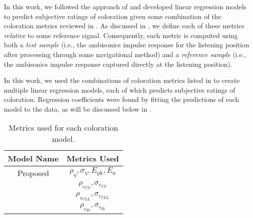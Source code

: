 In this work, we followed the approach of \citet{Wittek2007} and developed linear regression models to predict subjective ratings of coloration given some combination of the coloration metrics reviewed in .
As discussed in , we define each of these metrics \textit{relative} to some reference signal.
Consequently, each metric is computed using both a \textit{test sample} (i.e., the ambisonics impulse response for the listening position after processing through some navigational method) and a \textit{reference sample} (i.e., the ambisonics impulse response captured directly at the listening position).

In this work, we used the combinations of coloration metrics listed in  to create multiple linear regression models, each of which predicts subjective ratings of coloration.
Regression coefficients were found by fitting the predictions of each model to the data, as will be discussed below in .

\begin{table}[t]
\centering
 \begin{tabular}{|c|c|} \hline
 \textbf{Model Name} & \textbf{Metrics Used} \\ \hline
 Proposed & $\rho_\eta, \sigma_\eta, E_\text{pk}, E_\text{n}$ \\
 \citet{Kates1984} & $\rho_{e_\text{CS}}, \sigma_{e_\text{CS}}$ \\
 \citet{Pulkki1999} & $\rho_{e_\text{CLL}}, \sigma_{e_\text{CLL}}$ \\
 \citet{Wittek2007} & $\rho_{e_\text{IS}}, \sigma_{e_\text{IS}}$ \\ \hline
 \end{tabular}
 \caption{Metrics used for each coloration model.}
 \label{tab:Coloration_Models}
\end{table}